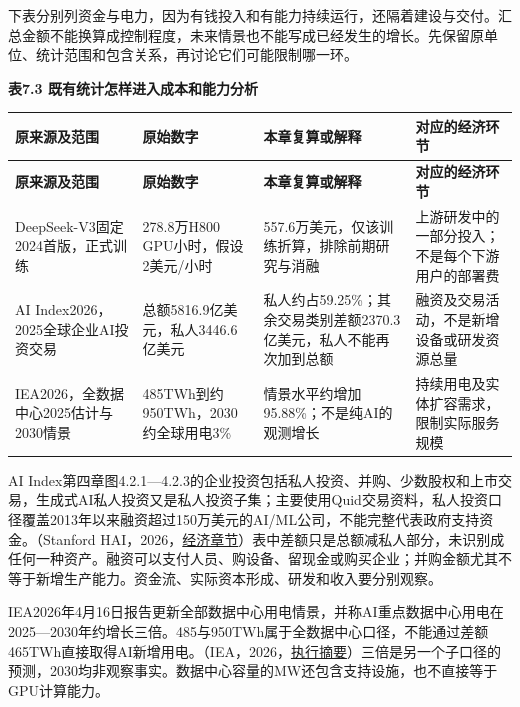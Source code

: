 \documentclass[UTF8,fontset=windows,12pt,a4paper,oneside,openany]{ctexbook}
\begin{document}
下表分别列资金与电力，因为有钱投入和有能力持续运行，还隔着建设与交付。汇总金额不能换算成控制程度，未来情景也不能写成已经发生的增长。先保留原单位、统计范围和包含关系，再讨论它们可能限制哪一环。

\textbf{表7.3 既有统计怎样进入成本和能力分析}

\begingroup\footnotesize\setlength{\tabcolsep}{4pt}\renewcommand{\arraystretch}{1.25}
\begin{longtable}{>{\raggedright\arraybackslash}p{}>{\raggedright\arraybackslash}p{}>{\raggedright\arraybackslash}p{}>{\raggedright\arraybackslash}p{}}
\toprule
\textbf{原来源及范围} & \textbf{原始数字} & \textbf{本章复算或解释} & \textbf{对应的经济环节} \\
\midrule\endfirsthead
\toprule
\textbf{原来源及范围} & \textbf{原始数字} & \textbf{本章复算或解释} & \textbf{对应的经济环节} \\
\midrule\endhead
\bottomrule\endfoot
DeepSeek-V3固定2024首版，正式训练 & 278.8万H800 GPU小时，假设2美元/小时 & 557.6万美元，仅该训练折算，排除前期研究与消融 & 上游研发中的一部分投入；不是每个下游用户的部署费 \\
AI Index2026，2025全球企业AI投资交易 & 总额5816.9亿美元，私人3446.6亿美元 & 私人约占59.25\%；其余交易类别差额2370.3亿美元，私人不能再次加到总额 & 融资及交易活动，不是新增设备或研发资源总量 \\
IEA2026，全数据中心2025估计与2030情景 & 485TWh到约950TWh，2030约全球用电3\% & 情景水平约增加95.88\%；不是纯AI的观测增长 & 持续用电及实体扩容需求，限制实际服务规模 \\
\end{longtable}\endgroup


AI Index第四章图4.2.1—4.2.3的企业投资包括私人投资、并购、少数股权和上市交易，生成式AI私人投资又是私人投资子集；主要使用Quid交易资料，私人投资口径覆盖2013年以来融资超过150万美元的AI/ML公司，不能完整代表政府支持资金。（Stanford HAI，2026，\href{https://hai.stanford.edu/assets/files/ai_index_report_2026_chapter_4_economy.pdf}{经济章节}）表中差额只是总额减私人部分，未识别成任何一种资产。融资可以支付人员、购设备、留现金或购买企业；并购金额尤其不等于新增生产能力。资金流、实际资本形成、研发和收入要分别观察。

IEA2026年4月16日报告更新全部数据中心用电情景，并称AI重点数据中心用电在2025—2030年约增长三倍。485与950TWh属于全数据中心口径，不能通过差额465TWh直接取得AI新增用电。（IEA，2026，\href{https://www.iea.org/reports/key-questions-on-energy-and-ai/executive-summary}{执行摘要}）三倍是另一个子口径的预测，2030均非观察事实。数据中心容量的MW还包含支持设施，也不直接等于GPU计算能力。
\end{document}
